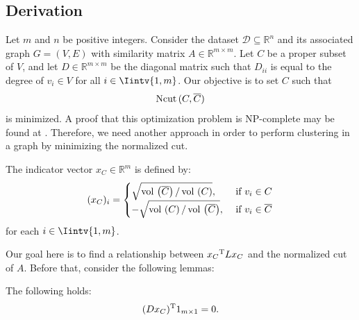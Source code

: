 \subsection{Derivation}

Let $m$ and $n$ be positive integers. 
Consider the dataset $\mathcal D \subseteq \mathbb R ^{n }$ and its associated graph $G = (V,E)$ with similarity matrix $A \in \mathbb R^{m \times m}$.
Let $C$ be a proper subset of $V$, and let $D \in \mathbb R ^{m \times m}$ be the diagonal matrix such that $D_{ii}$ is equal to the degree of $v_i \in V$ for all $i \in \Iintv{1,m}$.
Our objective is to set $C$ such that 
\begin{equation}
   \operatorname*{Ncut\,} (C, \overline C)
\end{equation}
is minimized.
A proof that this optimization problem is NP-complete may be found at \cite{normalized}. 
Therefore, we need another approach in order to perform clustering in a graph by minimizing the normalized cut.

\begin{definition}
The indicator vector $x_C \in \mathbb R ^{m }$ is defined by:
   \begin{equation} \label{indicator}
   (x_C)_i =
   \begin{cases}
      \sqrt{ \operatorname*{vol\,}  \left( \overline C \right) / \operatorname*{vol\,} \left( C \right) }, &\text{ if } v_i \in C \\
      -\sqrt{\operatorname*{vol\,} \left( C \right) / \operatorname*{vol\,} \left( \overline C \right)}, & \text{ if } v_i \in \overline C 
   \end{cases}
\end{equation}
for each $i \in \Iintv{1,m}$.
\end{definition}

Our goal here is to find a relationship between ${x_C}^{\rm T} L x_C$ and the normalized cut of $A$.
Before that, consider the following lemmas:

\begin{lemma} \label{cond1}
   The following holds:
   \begin{equation}
      (D x_C)^{\rm T} 1_{m \times 1} = 0.
   \end{equation}
\end{lemma}

